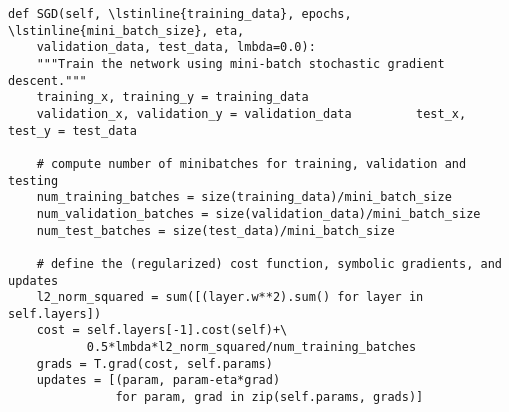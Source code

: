 \begin{lstlisting}
def SGD(self, \lstinline{training_data}, epochs, \lstinline{mini_batch_size}, eta, 
    validation_data, test_data, lmbda=0.0):
    """Train the network using mini-batch stochastic gradient descent."""
    training_x, training_y = training_data
    validation_x, validation_y = validation_data         test_x, test_y = test_data

    # compute number of minibatches for training, validation and testing
    num_training_batches = size(training_data)/mini_batch_size
    num_validation_batches = size(validation_data)/mini_batch_size
    num_test_batches = size(test_data)/mini_batch_size

    # define the (regularized) cost function, symbolic gradients, and updates
    l2_norm_squared = sum([(layer.w**2).sum() for layer in self.layers])
    cost = self.layers[-1].cost(self)+\
           0.5*lmbda*l2_norm_squared/num_training_batches
    grads = T.grad(cost, self.params)
    updates = [(param, param-eta*grad) 
               for param, grad in zip(self.params, grads)]


\end{lstlisting}

